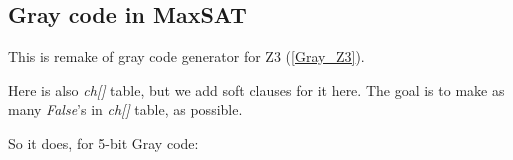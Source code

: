 \subsection{Gray code in MaxSAT}
\label{Gray_MaxSAT}

This is remake of gray code generator for Z3 (\ref{Gray_Z3}).

Here is also \textit{ch[]} table, but we add soft clauses for it here.
The goal is to make as many \textit{False}'s in \textit{ch[]} table, as possible.



So it does, for 5-bit Gray code:



